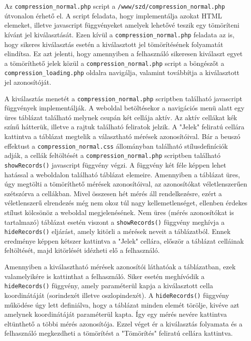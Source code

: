 \documentclass[oneside,titlepage,12pt,a4paper]{report}
\begin{document}
Az \texttt{compression\_normal.php} script a \texttt{/www/szd/compression\_normal.php} útvonalon érhető el. A script feladata, hogy implementálja azokat HTML elemeket, illetve javascript függvényeket amelyek lehetővé teszik egy tömöríteni kívánt jel kiválasztását. Ezen kívül a  \texttt{compression\_normal.php} feladata az is, hogy sikeres kiválasztás esetén a kiválasztott jel tömörítésének folyamatát elindítsa. Ez azt jelenti, hogy amennyiben a felhasználó sikeresen kiválaszt egyet a tömöríthető jelek közül a \texttt{compression\_normal.php} script a böngészőt a \texttt{compression\_loading.php} oldalra navigálja, valamint továbbítja a kiválasztott jel azonosítóját. 
\par A kiválasztás menetét a \texttt{compression\_normal.php} scriptben található javascript függvények implementálják. A weboldal betöltésekor a navigációs menü alatt egy üres táblázat található melynek csupán két cellája aktív. Az aktív cellákat kék színű hátterük, illetve a rajtuk található feliratok jelzik. A "Jelek" feliratú cellára kattintva a táblázat megtelik a választható mérések azonosítóival. Bár a beuszó effektust a \texttt{compression\_normal.css} állományban található stílusdefiníciók adják, a cellák feltöltését a \texttt{compression\_normal.php} scriptben található \texttt{showRecords()} javascript függvény végzi. A függvény két féle képpen lehet hatással a weboldalon található táblázat elemeire. Amennyiben a táblázat üres, úgy megtölti a tömöríthető mérések azonosítóival, az azonosítókat véletlenszerűen szétszórva a cellákban. Mivel összesen hét mérés áll rendelkezésre, ezért a véletlenszerű elrendezés még nem okoz túl nagy kellemetlenséget, ellenben érdekes stílust kölcsönöz a weboldal megjelenésének. Nem üres (mérés azonosítókat is tartalmazó) táblázat esetén viszont a \texttt{showRecords()} függvény meghívja a \texttt{hideRecords()} eljárást, amely kitörli a mérések neveit a táblázatból. Ennek eredménye képpen kétszer kattintva a "Jelek" cellára, először a táblázat celláinak feltöltését, majd kitörlését idézheti elő a felhasználó. 
\par Amennyiben a kiválasztható mérések azonosítói láthatóak a táblázatban, ezek valamelyikére is kattinthat a felhasználó. Siker esetén meghívódik a \texttt{hideRecords()} függvény, amely paraméterül kapja a kiválasztott cella koordinátáját (sorindexét illetve oszlopindexét). A \texttt{hideRecords()} függvény működése úgy lett definiálva, hogy a táblázat minden elemét törölje, kivéve azt amelynek koordinátáját paraméterül kapta. Így egy mérés nevére kattintva eltünthető a többi mérés azonosítója. Ezzel véget ér a kiválasztás folyamata és a felhasználó megkezdheti a tömörítést a "Tömörítés" feliratú cellára kattintva. 
\end{document}
